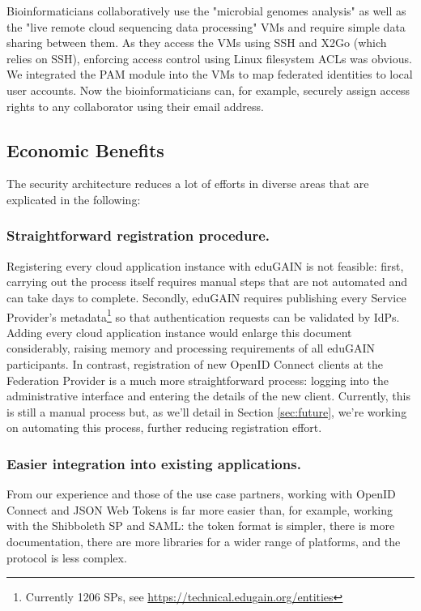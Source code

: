 \documentclass{llncs}
\begin{document}
Bioinformaticians collaboratively use the "microbial genomes analysis" as well as the "live remote cloud sequencing data processing" VMs and require simple data sharing between them. As they access the VMs using SSH and X2Go (which relies on SSH), enforcing access control using Linux filesystem ACLs was obvious. We integrated the PAM module into the VMs to map federated identities to local user accounts. Now the bioinformaticians can, for example, securely assign access rights to any collaborator using their email address.

\subsection{Economic Benefits}

The security architecture reduces a lot of efforts in diverse areas that are explicated in the following:

\subsubsection{Straightforward registration procedure.} Registering every cloud application instance with eduGAIN is not feasible: first, carrying out the process itself requires manual steps that are not automated and can take days to complete. Secondly, eduGAIN requires publishing every Service Provider's metadata\footnote{Currently 1206 SPs, see \url{https://technical.edugain.org/entities}} so that authentication requests can be validated by IdPs. Adding every cloud application instance would enlarge this document considerably, raising memory and processing requirements of all eduGAIN participants. In contrast, registration of new OpenID Connect clients at the Federation Provider is a much more straightforward process: logging into the administrative interface and entering the details of the new client. Currently, this is still a manual process but, as we'll detail in Section \ref{sec:future}, we're working on automating this process, further reducing registration effort.

\subsubsection{Easier integration into existing applications.}

From our experience and those of the use case partners, working with OpenID Connect and JSON Web Tokens is far more easier than, for example, working with the Shibboleth SP and SAML: the token format is simpler, there is more documentation, there are more libraries for a wider range of platforms, and the protocol is less complex.
\end{document}
